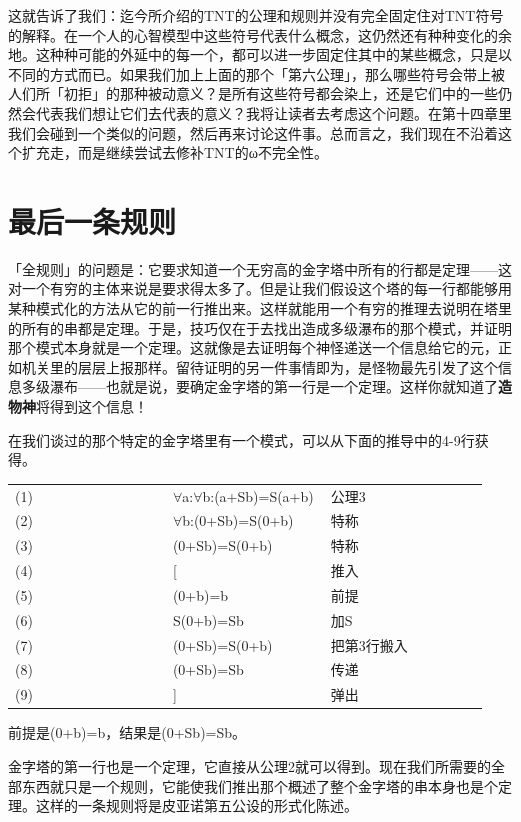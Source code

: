\documentclass[
  12pt,
  twoside,
  openright,
  oldfontcommands,
]{memoir}
\newcommand{\heititext}[1]{{\heifamily\bfseries #1}}
\begin{document}
这就告诉了我们：迄今所介绍的TNT的公理和规则并没有完全固定住对TNT符号的解释。在一个人的心智模型中这些符号代表什么概念，这仍然还有种种变化的余地。这种种可能的外延中的每一个，都可以进一步固定住其中的某些概念，只是以不同的方式而已。如果我们加上上面的那个「第六公理」，那么哪些符号会带上被人们所「初拒」的那种被动意义？是所有这些符号都会染上，还是它们中的一些仍然会代表我们想让它们去代表的意义？我将让读者去考虑这个问题。在第十四章里我们会碰到一个类似的问题，然后再来讨论这件事。总而言之，我们现在不沿着这个扩充走，而是继续尝试去修补TNT的ω不完全性。

\section{最后一条规则}

「全规则」的问题是：它要求知道一个无穷高的金字塔中所有的行都是定理------这对一个有穷的主体来说是要求得太多了。但是让我们假设这个塔的每一行都能够用某种模式化的方法从它的前一行推出来。这样就能用一个有穷的推理去说明在塔里的所有的串都是定理。于是，技巧仅在于去找出造成多级瀑布的那个模式，并证明那个模式本身就是一个定理。这就像是去证明每个神怪递送一个信息给它的元，正如机关里的层层上报那样。留待证明的另一件事情即为，是怪物最先引发了这个信息多级瀑布------也就是说，要确定金字塔的第一行是一个定理。这样你就知道了\heititext{造物神}将得到这个信息！

在我们谈过的那个特定的金字塔里有一个模式，可以从下面的推导中的4-9行获得。

\begin{longtable}[]{>{\raggedright\arraybackslash}p{0.313\linewidth} >{\raggedright\arraybackslash}p{0.313\linewidth} >{\raggedright\arraybackslash}p{0.313\linewidth}}
\toprule\noalign{}
\endhead
\bottomrule\noalign{}
\endlastfoot
(1) & $\forall$a:$\forall$b:(a+Sb)=S(a+b) & 公理3 \\
(2) & $\forall$b:(0+Sb)=S(0+b) & 特称 \\
(3) & (0+Sb)=S(0+b) & 特称 \\
(4) & {[} & 推入 \\
(5) & (0+b)=b & 前提 \\
(6) & S(0+b)=Sb & 加S \\
(7) & (0+Sb)=S(0+b) & 把第3行搬入 \\
(8) & (0+Sb)=Sb & 传递 \\
(9) & {]} & 弹出 \\
\end{longtable}

前提是(0+b)=b，结果是(0+Sb)=Sb。

金字塔的第一行也是一个定理，它直接从公理2就可以得到。现在我们所需要的全部东西就只是一个规则，它能使我们推出那个概述了整个金字塔的串本身也是个定理。这样的一条规则将是皮亚诺第五公设的形式化陈述。
\end{document}
